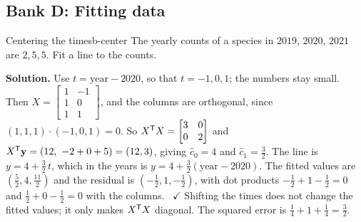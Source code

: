 \documentclass[11pt]{article}
\begin{document}
\subsection*{Bank D: Fitting data}
\begin{exmp}{Centering the times}{b-center}
The yearly counts of a species in $2019$, $2020$, $2021$ are $2,5,5$. Fit a line to the counts.

\textbf{Solution.} Use $t=\text{year}-2020$, so that $t=-1,0,1$; the numbers stay small. Then $X=\begin{bmatrix}1&-1\\1&0\\1&1\end{bmatrix}$, and the columns are orthogonal, since $(1,1,1)\cdot(-1,0,1)=0$. So $X^{\mathsf T} X=\begin{bmatrix}3&0\\0&2\end{bmatrix}$ and $X^{\mathsf T}\mathbf{y}=(12,\ -2+0+5)=(12,3)$, giving $\hat{c}_0=4$ and $\hat{c}_1=\tfrac32$. The line is $y=4+\tfrac32\,t$, which in the years is $y=4+\tfrac32(\text{year}-2020)$. The fitted values are $(\tfrac52,4,\tfrac{11}2)$ and the residual is $(-\tfrac12,1,-\tfrac12)$, with dot products $-\tfrac12+1-\tfrac12=0$ and $\tfrac12+0-\tfrac12=0$ with the columns. \ $\checkmark$ Shifting the times does not change the fitted values; it only makes $X^{\mathsf T} X$ diagonal. The squared error is $\tfrac14+1+\tfrac14=\tfrac32$.
\end{exmp}
\end{document}
